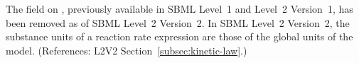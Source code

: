The  field on \Reaction, previously
available in SBML Level~1 and Level~2 Version~1, has been removed
as of SBML Level~2 Version~2.  In SBML Level~2 Version~2, the
substance units of a reaction rate expression are those of the
global  units of the model.  (References: L2V2
Section~\ref{subsec:kinetic-law}.)

